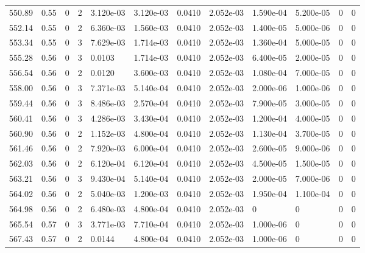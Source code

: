 \documentclass[preview]{standalone}
\begin{document}
{{{{{{{{{{{{{{{{{\begin{tabular}{L{1.2cm}C{1.2cm} C{0.3cm}C{0.5cm} C{1.4cm}C{1.4cm} C{1.4cm}C{1.4cm} C{1.6cm}C{1.6cm} C{1.6cm}C{1.6cm}}
  550.89  &  0.55  & 0     &  2 &  3.120e-03  & 3.120e-03  &  0.0410&   2.052e-03& 1.590e-04 & 5.200e-05   &  0 & 0  \\ 
  552.14  &  0.55  & 0     &  2 &  6.360e-03  & 1.560e-03  &  0.0410&   2.052e-03& 1.400e-05 & 5.000e-06   &  0 & 0  \\ 
  553.34  &  0.55  & 0     &  3 &  7.629e-03  & 1.714e-03  &  0.0410&   2.052e-03& 1.360e-04 & 5.000e-05   &  0 & 0  \\ 
  555.28  &  0.56  & 0     &  3 &  0.0103  & 1.714e-03  &  0.0410&   2.052e-03& 6.400e-05 & 2.000e-05   &  0 & 0  \\ 
  556.54  &  0.56  & 0     &  2 &  0.0120  & 3.600e-03  &  0.0410&   2.052e-03& 1.080e-04 & 7.000e-05   &  0 & 0  \\ 
  558.00  &  0.56  & 0     &  3 &  7.371e-03  & 5.140e-04  &  0.0410&   2.052e-03& 2.000e-06 & 1.000e-06   &  0 & 0  \\ 
  559.44  &  0.56  & 0     &  3 &  8.486e-03  & 2.570e-04  &  0.0410&   2.052e-03& 7.900e-05 & 3.000e-05   &  0 & 0  \\ 
  560.41  &  0.56  & 0     &  3 &  4.286e-03  & 3.430e-04  &  0.0410&   2.052e-03& 1.200e-04 & 4.000e-05   &  0 & 0  \\ 
  560.90  &  0.56  & 0     &  2 &  1.152e-03  & 4.800e-04  &  0.0410&   2.052e-03& 1.130e-04 & 3.700e-05   &  0 & 0  \\ 
  561.46  &  0.56  & 0     &  2 &  7.920e-03  & 6.000e-04  &  0.0410&   2.052e-03& 2.600e-05 & 9.000e-06   &  0 & 0  \\ 
  562.03  &  0.56  & 0     &  2 &  6.120e-04  & 6.120e-04  &  0.0410&   2.052e-03& 4.500e-05 & 1.500e-05   &  0 & 0  \\ 
  563.21  &  0.56  & 0     &  3 &  9.430e-04  & 5.140e-04  &  0.0410&   2.052e-03& 2.000e-05 & 7.000e-06   &  0 & 0  \\ 
  564.02  &  0.56  & 0     &  2 &  5.040e-03  & 1.200e-03  &  0.0410&   2.052e-03& 1.950e-04 & 1.100e-04   &  0 & 0  \\ 
  564.98  &  0.56  & 0     &  2 &  6.480e-03  & 4.800e-04  &  0.0410&   2.052e-03& 0 & 0   &  0 & 0  \\ 
  565.54  &  0.57  & 0     &  3 &  3.771e-03  & 7.710e-04  &  0.0410&   2.052e-03& 1.000e-06 & 0   &  0 & 0  \\ 
  567.43  &  0.57  & 0     &  2 &  0.0144  & 4.800e-04  &  0.0410&   2.052e-03& 1.000e-06 & 0   &  0 & 0  \\ 
\hline 
\end{tabular} 

}}}}}}}}}}}}}}}}}
\end{document}

